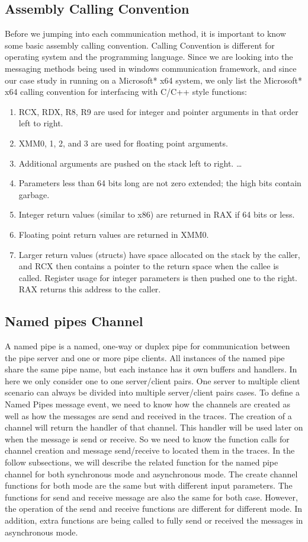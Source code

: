 \documentclass[paper=a4, fontsize=11pt]{scrartcl}
\numberwithin{equation}{section}		%
\numberwithin{figure}{section}			%
\numberwithin{table}{section}				%
\begin{document}
\subsection{Assembly Calling Convention}
Before we jumping into each communication method, it is important to know some basic assembly calling convention.
Calling Convention is different for operating system and the programming language. Since we are looking into the messaging methods being used in windows communication framework, and since our case study in running on a Microsoft* x64 system, we only list the Microsoft* x64 calling convention for interfacing with C/C++ style functions:\par
\begin{enumerate}  
\item RCX, RDX, R8, R9 are used for integer and pointer arguments in that order left to right.
\item XMM0, 1, 2, and 3 are used for floating point arguments.
\item Additional arguments are pushed on the stack left to right. \ldots 
\item Parameters less than 64 bits long are not zero extended; the high bits contain garbage.
\item Integer return values (similar to x86) are returned in RAX if 64 bits or less.
\item Floating point return values are returned in XMM0.
\item Larger return values (structs) have space allocated on the stack by the caller, and RCX then contains a pointer to the return space when the callee is called. Register usage for integer parameters is then pushed one to the right. RAX returns this address to the caller.
\end{enumerate}

\subsection{Named pipes Channel}
A named pipe is a named, one-way or duplex pipe for communication between the pipe server and one or more pipe clients. All instances of the named pipe share the same pipe name, but each instance has it own buffers and handlers. In here we only consider one to one server/client pairs. One server to multiple client scenario can always be divided into multiple server/client pairs cases. To define a Named Pipes message event, we need to know how the channels are created as well as how the messages are send and received in the traces. The creation of a channel will return the handler of that channel. This handler will be used later on when the message is send or receive. So we need to know the function calls for channel creation and message send/receive to located them in the traces. In the follow subsections, we will describe the related function for the named pipe channel for both synchronous mode and asynchronous mode. The create channel functions for both mode are the same but with different input parameters. The functions for send and receive message are also the same for both case. However, the operation of the send and receive functions are different for different mode. In addition, extra functions are being called to fully send or received the messages in asynchronous mode.
\end{document}
